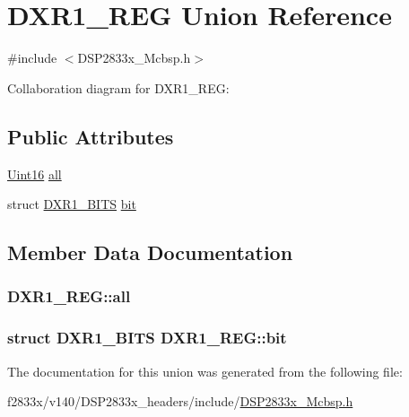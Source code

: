 \hypertarget{union_d_x_r1___r_e_g}{}\section{D\+X\+R1\+\_\+\+R\+E\+G Union Reference}
\label{union_d_x_r1___r_e_g}


{\ttfamily \#include $<$D\+S\+P2833x\+\_\+\+Mcbsp.\+h$>$}



Collaboration diagram for D\+X\+R1\+\_\+\+R\+E\+G\+:
\subsection*{Public Attributes}
\begin{DoxyCompactItemize}
\item 
\hyperlink{_d_s_p2833x___device_8h_a59a9f6be4562c327cbfb4f7e8e18f08b}{Uint16} \hyperlink{union_d_x_r1___r_e_g_a579f3a80d0eae6afbe3b6ac8488d46f2}{all}
\item 
struct \hyperlink{struct_d_x_r1___b_i_t_s}{D\+X\+R1\+\_\+\+B\+I\+T\+S} \hyperlink{union_d_x_r1___r_e_g_a974c26fdecaf991763752ebf26d03417}{bit}
\end{DoxyCompactItemize}


\subsection{Member Data Documentation}
\hypertarget{union_d_x_r1___r_e_g_a579f3a80d0eae6afbe3b6ac8488d46f2}{}
\subsubsection[{all}]{ D\+X\+R1\+\_\+\+R\+E\+G\+::all}\label{union_d_x_r1___r_e_g_a579f3a80d0eae6afbe3b6ac8488d46f2}
\hypertarget{union_d_x_r1___r_e_g_a974c26fdecaf991763752ebf26d03417}{}
\subsubsection[{bit}]{\setlength{\rightskip}{0pt plus 5cm}struct {\bf D\+X\+R1\+\_\+\+B\+I\+T\+S} D\+X\+R1\+\_\+\+R\+E\+G\+::bit}\label{union_d_x_r1___r_e_g_a974c26fdecaf991763752ebf26d03417}


The documentation for this union was generated from the following file\+:\begin{DoxyCompactItemize}
\item 
f2833x/v140/\+D\+S\+P2833x\+\_\+headers/include/\hyperlink{_d_s_p2833x___mcbsp_8h}{D\+S\+P2833x\+\_\+\+Mcbsp.\+h}\end{DoxyCompactItemize}
